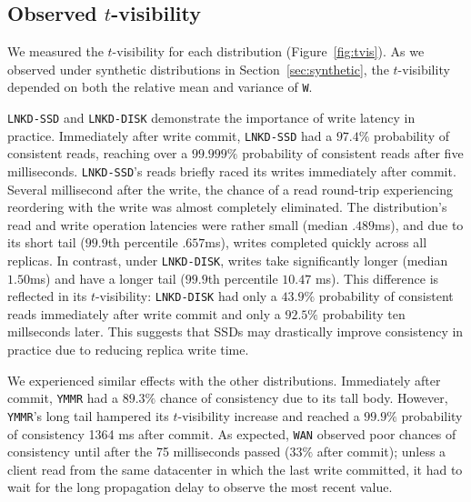 \documentclass{vldb}
\newcommand{\subsectionskip}{-0em}
\begin{document}
\vspace{\subsectionskip}\subsection{Observed {\large$t$}-visibility}

We measured the $t$-visibility for each distribution
(Figure~\ref{fig:tvis}). As we observed under synthetic distributions
in Section~\ref{sec:synthetic}, the $t$-visibility depended on both
the relative mean and variance of \texttt{W}.

\texttt{LNKD-SSD} and \texttt{LNKD-DISK} demonstrate the importance of
write latency in practice.  Immediately after write commit,
\texttt{LNKD-SSD} had a $97.4\%$ probability of consistent reads,
reaching over a $99.999\%$ probability of consistent reads after five
milliseconds. \texttt{LNKD-SSD}'s reads briefly raced its writes
immediately after commit.  Several millisecond after the write, the
chance of a read round-trip experiencing reordering with the write was
almost completely eliminated. The distribution's read and write
operation latencies were rather small (median $.489$ms), and due to
its short tail ($99.9$th percentile $.657$ms), writes completed
quickly across all replicas.  In contrast, under \texttt{LNKD-DISK},
writes take significantly longer (median $1.50$ms) and have a longer
tail ($99.9$th percentile $10.47$ ms).  This difference is reflected
in its $t$-visibility: \texttt{LNKD-DISK} had only a $43.9\%$
probability of consistent reads immediately after write commit and
only a $92.5\%$ probability ten millseconds later.  This suggests that
SSDs may drastically improve consistency in practice due to reducing
replica write time.

We experienced similar effects with the other distributions.
Immediately after commit, \texttt{YMMR} had a $89.3\%$ chance of
consistency due to its tall body.  However, \texttt{YMMR}'s long tail
hampered its $t$-visibility increase and reached a $99.9\%$
probability of consistency 1364 ms after commit.  As expected,
\texttt{WAN} observed poor chances of consistency until after the 75
milliseconds passed ($33\%$ after commit); unless a client read from
the same datacenter in which the last write committed, it had to wait
for the long propagation delay to observe the most recent value.
\end{document}
